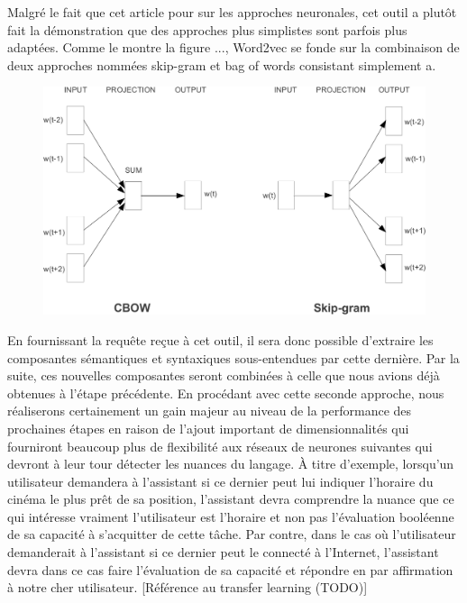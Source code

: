 \documentclass[11pt]{article}
\begin{document}
Malgré le fait que cet article pour sur les approches neuronales, cet outil a plutôt fait la démonstration que des approches plus simplistes sont parfois plus adaptées. Comme le montre la figure ..., Word2vec se fonde sur la combinaison de deux approches nommées skip-gram et bag of words consistant simplement a. \\

\begin{figure}[ht]
  \includegraphics{./../fig/word2vec}
\end{figure}

En fournissant la requête reçue à cet outil, il sera donc possible d'extraire les composantes sémantiques et syntaxiques sous-entendues par cette dernière. Par la suite, ces nouvelles composantes seront combinées à celle que nous avions déjà obtenues à l'étape précédente. En procédant avec cette seconde approche, nous réaliserons certainement un gain majeur au niveau de la performance des prochaines étapes en raison de l'ajout important de dimensionnalités qui fourniront beaucoup plus de flexibilité aux réseaux de neurones suivantes qui devront à leur tour détecter les nuances du langage. À titre d'exemple, lorsqu'un utilisateur demandera à l'assistant si ce dernier peut lui indiquer l'horaire du cinéma le plus prêt de sa position, l'assistant devra comprendre la nuance que ce qui intéresse vraiment l'utilisateur est l'horaire et non pas l'évaluation booléenne de sa capacité à s'acquitter de cette tâche. Par contre, dans le cas où l'utilisateur demanderait à l'assistant si ce dernier peut le connecté à l'Internet, l'assistant devra dans ce cas faire l'évaluation de sa capacité et répondre en par affirmation à notre cher utilisateur. [Référence au transfer learning (TODO)] \\
\end{document}
